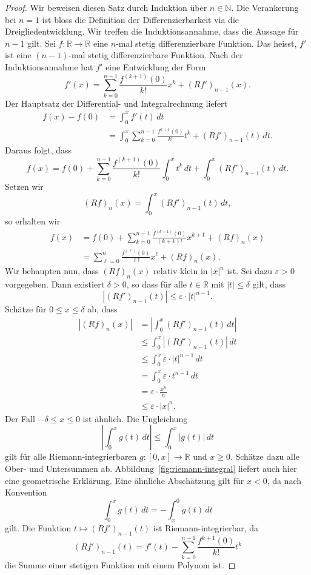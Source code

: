 \documentclass[../main.tex]{subfiles}
\begin{document}
\begin{proof}
  Wir beweisen diesen Satz durch Induktion über $n \in \mathbb{N}$.
  Die Verankerung bei $n = 1$ ist bloss die Definition der Differenzierbarkeit
  via die Dreigliedentwicklung.
  Wir treffen die Induktionsannahme, dass die Aussage für $n-1$ gilt.
  Sei $f \colon \mathbb{R} \to \mathbb{R}$ eine $n$-mal stetig differenzierbare Funktion.
  Das heisst, $f'$ ist eine $(n-1)$-mal stetig differenzierbare Funktion.
  Nach der Induktionsannahme hat $f'$ eine Entwicklung der Form
  \[
    f'(x) = \sum_{k=0}^{n-1} \frac{f^{(k+1)}(0)}{k!}x^k + {(Rf')}_{n-1}(x).
  \]
  Der Hauptsatz der Differential- und Integralrechnung liefert
  \begin{align*}
    f(x) - f(0) & = \int_{0}^{x} f'(t) \, dt \\
                & = \int_{0}^{x} \sum_{k=0}^{n-1} \frac{f^{k+1}(0)}{k!}t^k
                + {(Rf')}_{n-1}(t)\, dt.
  \end{align*}
  Daraus folgt, dass
  \[
    f(x) = f(0) + \sum_{k=0}^{n-1} \frac{f^{(k+1)}(0)}{k!} \int_{0}^{x} t^k \, dt
    + \int_{0}^{x} {(Rf')}_{n-1}(t) \, dt.
  \]
  Setzen wir
  \[
    {(Rf)}_n(x) = \int_{0}^{x} {(Rf')}_{n-1}(t) \, dt,
  \]
  so erhalten wir
  \begin{align*}
    f(x) & = f(0) + \sum_{k=0}^{n-1} \frac{f^{(k+1)}(0)}{(k+1)!}x^{k+1} + {(Rf)}_n(x) \\
         & = \sum_{\ell=0}^{n} \frac{f^{(\ell)}(0)}{\ell!}x^{\ell} + {(Rf)}_n(x).
  \end{align*}
  Wir behaupten nun, dass ${(Rf)}_n(x)$ relativ klein in $|x|^n$ ist.
  Sei dazu $\varepsilon > 0$ vorgegeben. Dann existiert $\delta > 0$,
  so dass für alle $t \in \mathbb{R}$ mit $|t| \leq \delta$ gilt,
  dass
  \[
    |{(Rf')}_{n-1}(t)| \leq \varepsilon \cdot |t|^{n-1}.
  \]
  Schätze für $0 \leq x \leq \delta$ ab, dass
  \begin{align*}
    |{(Rf)}_n(x)| 
    &= \left| \int_{0}^{x} {(Rf')}_{n-1}(t) \, dt \right|  \\
    &\leq \int_{0}^{x} |{(Rf')}_{n-1}(t)| \, dt \\
    &\leq \int_{0}^{x} \varepsilon \cdot |t|^{n-1} \, dt \\
    &= \int_{0}^{x} \varepsilon \cdot t^{n-1} \, dt \\
    &= \varepsilon \cdot \frac{x^n}{n} \\
    &\leq \varepsilon \cdot |x|^n.
  \end{align*}
  Der Fall $-\delta \leq x \leq 0$ ist ähnlich.
  Die Ungleichung
  \[
    \left| \int_{0}^{x} g(t) \, dt \right| \leq \int_{0}^{x} |g(t)| \, dt
  \]
  gilt für alle Riemann-integrierbaren $g \colon [0, x] \to \mathbb{R}$
  und $x \geq 0$.
  Schätze dazu alle Ober- und Untersummen ab.
  Abbildung~\ref{fig:riemann-integral} liefert auch hier eine geometrische Erklärung.
  Eine ähnliche Abschätzung gilt für $x < 0$, da nach Konvention
  \[
    \int_{0}^{x} g(t) \, dt = - \int_{x}^{0} g(t) \, dt
  \]
  gilt.
  Die Funktion $t \mapsto {(Rf')}_{n-1}(t)$ ist Riemann-integrierbar, da
  \[
    {(Rf')}_{n-1}(t) = f'(t) - \sum_{k=0}^{n-1} \frac{f^{k+1}(0)}{k!}t^k
  \]
  die Summe einer stetigen Funktion mit einem Polynom ist.
\end{proof}
\end{document}
